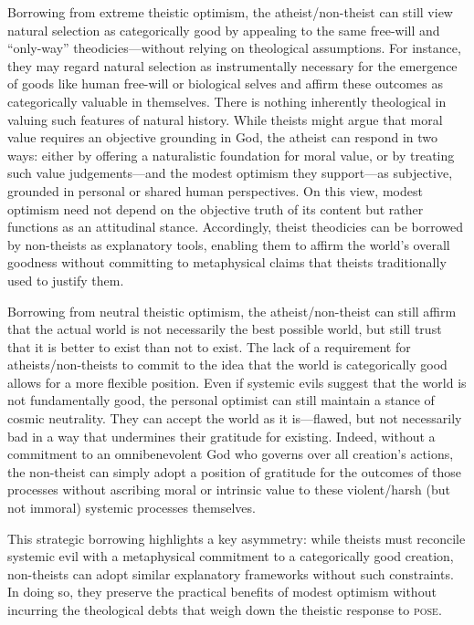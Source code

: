 Borrowing from extreme theistic optimism, the atheist/non-theist can
still view natural selection as categorically good by appealing to the
same free-will and ``only-way'' theodicies---without relying on
theological assumptions. For instance, they may regard natural selection
as instrumentally necessary for the emergence of goods like human
free-will or biological selves and affirm these outcomes as
categorically valuable in themselves. There is nothing inherently
theological in valuing such features of natural history. While theists
might argue that moral value requires an objective grounding in God, the
atheist can respond in two ways: either by offering a naturalistic
foundation for moral value, or by treating such value judgements---and
the modest optimism they support---as subjective, grounded in personal
or shared human perspectives. On this view, modest optimism need not
depend on the objective truth of its content but rather functions as an
attitudinal stance. Accordingly, theist theodicies can be borrowed by
non-theists as explanatory tools, enabling them to affirm the world's
overall goodness without committing to metaphysical claims that theists
traditionally used to justify them.

Borrowing from neutral theistic optimism, the atheist/non-theist can
still affirm that the actual world is not necessarily the best possible
world, but still trust that it is better to exist than not to exist. The
lack of a requirement for atheists/non-theists to commit to the idea
that the world is categorically good allows for a more flexible
position. Even if systemic evils suggest that the world is not
fundamentally good, the personal optimist can still maintain a stance of
cosmic neutrality. They can accept the world as it is---flawed, but not
necessarily bad in a way that undermines their gratitude for existing.
Indeed, without a commitment to an omnibenevolent God who governs over
all creation's actions, the non-theist can simply adopt a position of
gratitude for the outcomes of those processes without ascribing moral or
intrinsic value to these violent/harsh (but not immoral) systemic
processes themselves.

This strategic borrowing highlights a key asymmetry: while theists must
reconcile systemic evil with a metaphysical commitment to a
categorically good creation, non-theists can adopt similar explanatory
frameworks without such constraints. In doing so, they preserve the
practical benefits of modest optimism without incurring the theological
debts that weigh down the theistic response to \textsc{pose}.

